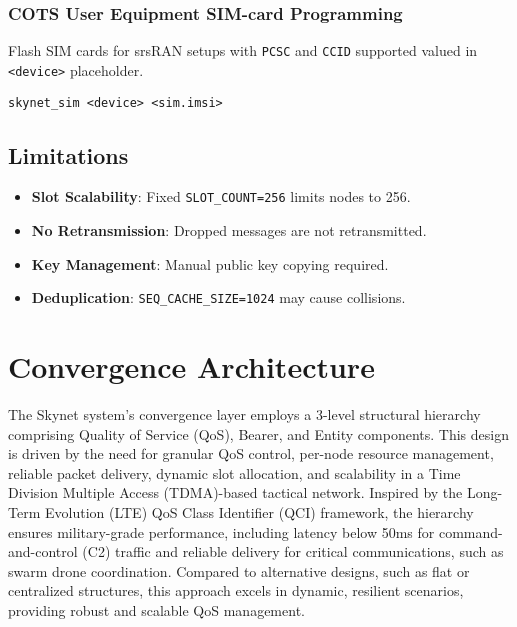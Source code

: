\documentclass{article}
\begin{document}
\subsubsection*{COTS User Equipment SIM-card Programming}
Flash SIM cards for srsRAN setups with \texttt{PCSC} and \texttt{CCID} supported valued in \texttt{<device>} placeholder.
\begin{lstlisting}
skynet_sim <device> <sim.imsi>
\end{lstlisting}

\subsection{Limitations}
\begin{itemize}
    \item \textbf{Slot Scalability}: Fixed \texttt{SLOT\_COUNT=256} limits nodes to 256.
    \item \textbf{No Retransmission}: Dropped messages are not retransmitted.
    \item \textbf{Key Management}: Manual public key copying required.
    \item \textbf{Deduplication}: \texttt{SEQ\_CACHE\_SIZE=1024} may cause collisions.
\end{itemize}

\section{Convergence Architecture}
The Skynet system's convergence layer employs a 3-level structural hierarchy comprising Quality of
Service (QoS), Bearer, and Entity components. This design is driven by the need for granular QoS
control, per-node resource management, reliable packet delivery, dynamic slot allocation, and
scalability in a Time Division Multiple Access (TDMA)-based tactical network. Inspired by the
Long-Term Evolution (LTE) QoS Class Identifier (QCI) framework, the hierarchy ensures military-grade
performance, including latency below 50ms for command-and-control (C2) traffic and reliable delivery
for critical communications, such as swarm drone coordination. Compared to alternative designs, such
as flat or centralized structures, this approach excels in dynamic, resilient scenarios, providing
robust and scalable QoS management.
\end{document}
